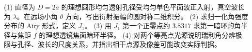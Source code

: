 (1) 直径为 \(D=2a\) 的理想圆形均匀透射孔径受均匀单色平面波正入射，真空波长为 \(\lambda\)。在远场小角 \(\theta\) 方向，写出衍射振幅的圆对称二维积分。
(2) 求归一化角强度分布的 Airy 形式，定义 \(J_1\)。
(3) 用 \(J_1\) 第一个正零点约 \(3.8317\) 求第一暗环的角半径与焦距 \(f\) 的理想透镜焦面暗环半径。
(4) 对两个等亮点光源说明瑞利角分辨极限与孔径、波长的尺度关系，并指出相干点源及像差可能改变实际判据。
